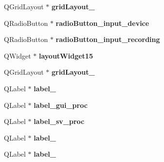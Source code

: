 \begin{DoxyCompactItemize}
\item 
\hypertarget{class_ui___main_window_aed885e9b4e8efc6da855c44aa087922e}{}Q\+Grid\+Layout $\ast$ {\bfseries grid\+Layout\+\_}\label{class_ui___main_window_aed885e9b4e8efc6da855c44aa087922e}

\item 
\hypertarget{class_ui___main_window_aea0596c7ec00a3053e4895ce6aa9cdf0}{}Q\+Radio\+Button $\ast$ {\bfseries radio\+Button\+\_\+input\+\_\+device}\label{class_ui___main_window_aea0596c7ec00a3053e4895ce6aa9cdf0}

\item 
\hypertarget{class_ui___main_window_ab899b7b853618a0afd3a2e1db26b2f22}{}Q\+Radio\+Button $\ast$ {\bfseries radio\+Button\+\_\+input\+\_\+recording}\label{class_ui___main_window_ab899b7b853618a0afd3a2e1db26b2f22}

\item 
\hypertarget{class_ui___main_window_a05f36d40758ac6e8a934e863398ba1fc}{}Q\+Widget $\ast$ {\bfseries layout\+Widget15}\label{class_ui___main_window_a05f36d40758ac6e8a934e863398ba1fc}

\item 
\hypertarget{class_ui___main_window_aa03590dd5aac614bf717649a544c015f}{}Q\+Grid\+Layout $\ast$ {\bfseries grid\+Layout\+\_}\label{class_ui___main_window_aa03590dd5aac614bf717649a544c015f}

\item 
\hypertarget{class_ui___main_window_a9125c3f58951f983d461686ccaabb468}{}Q\+Label $\ast$ {\bfseries label\+\_}\label{class_ui___main_window_a9125c3f58951f983d461686ccaabb468}

\item 
\hypertarget{class_ui___main_window_a9ed44bb5262e7b18269314af2a731931}{}Q\+Label $\ast$ {\bfseries label\+\_\+gui\+\_\+proc}\label{class_ui___main_window_a9ed44bb5262e7b18269314af2a731931}

\item 
\hypertarget{class_ui___main_window_aab3820761ed28eeac8b57f83e73bd051}{}Q\+Label $\ast$ {\bfseries label\+\_\+sv\+\_\+proc}\label{class_ui___main_window_aab3820761ed28eeac8b57f83e73bd051}

\item 
\hypertarget{class_ui___main_window_a4a18586583a48765b392cbab0ea7545c}{}Q\+Label $\ast$ {\bfseries label\+\_}\label{class_ui___main_window_a4a18586583a48765b392cbab0ea7545c}

\item 
\hypertarget{class_ui___main_window_ad0a5580e9e7432ed041d6c2d587cd13e}{}Q\+Label $\ast$ {\bfseries label\+\_}\label{class_ui___main_window_ad0a5580e9e7432ed041d6c2d587cd13e}


\end{DoxyCompactItemize}
